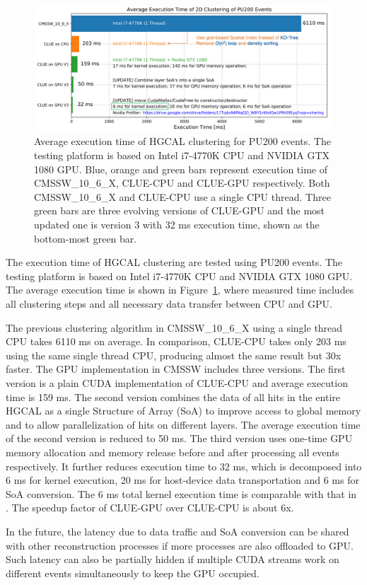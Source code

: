 \begin{figure}[ht]
    \centering
    \includegraphics[trim=0cm 0cm 0cm 0cm, clip,width=0.99\textwidth]{chapters/HGCal/figures/chep/performance.png}
    \caption{ 
    Average execution time of HGCAL clustering for PU200 events. The testing platform is based on Intel i7-4770K CPU and NVIDIA GTX 1080 GPU. Blue, orange and green bars represent execution time of CMSSW\_10\_6\_X, CLUE-CPU and CLUE-GPU respectively. Both CMSSW\_10\_6\_X and CLUE-CPU use a single CPU thread. Three green bars are three evolving versions of CLUE-GPU and the most updated one is version 3 with 32 ms execution time, shown as the bottom-most green bar.
    }
    \label{fig:performance}
\end{figure}

The execution time of HGCAL clustering are tested using PU200 events. The testing platform is based on Intel i7-4770K CPU and NVIDIA GTX 1080 GPU. The average execution time is shown in Figure~\ref{fig:performance}, where measured time includes all clustering steps and all necessary data transfer between CPU and GPU. 

The previous clustering algorithm in CMSSW\_10\_6\_X using a single thread CPU takes 6110 ms on average. In comparison, CLUE-CPU takes only 203 ms using the same single thread CPU, producing almost the same result but 30x faster. The GPU implementation in CMSSW includes three versions. The first version is a plain CUDA implementation of CLUE-CPU and average execution time is 159 ms. The second version combines the data of all hits in the entire HGCAL as a single Structure of Array (SoA) to improve access to global memory and to allow parallelization of hits on different layers. The average execution time of the second version is reduced to 50 ms. The third version uses one-time GPU memory allocation and memory release before and after processing all events respectively. It further reduces execution time to 32 ms, which is decomposed into 6 ms for kernel execution, 20 ms for host-device data transportation and 6 ms for SoA conversion. The 6 ms total kernel execution time is comparable with that in \cite{cluepaper}. The speedup factor of CLUE-GPU over CLUE-CPU is about 6x. 

In the future, the latency due to data traffic and SoA conversion can be shared with other reconstruction processes if more processes are also offloaded to GPU. Such latency can also be partially hidden if multiple CUDA streams work on different events simultaneously to keep the GPU occupied.
